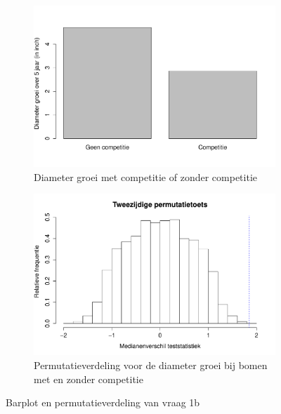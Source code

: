 \documentclass[11pt, a4paper]{article}
\begin{document}
\begin{figure}[H]
	\begin{center}
		\begin{subfigure}{0.49\textwidth}
			\includegraphics[scale=0.35]{barplot_b.pdf}
			\caption{Diameter groei met competitie of zonder competitie}
			\label{barb}
		\end{subfigure}
		\begin{subfigure}{0.49\textwidth}
			\includegraphics[scale=0.35]{perm_b.pdf}
			\caption{Permutatieverdeling voor de diameter groei bij bomen met en zonder competitie}
			\label{permb}
		\end{subfigure}
	\end{center}
	\caption{Barplot en permutatieverdeling van vraag 1b}
\end{figure}
\end{document}
